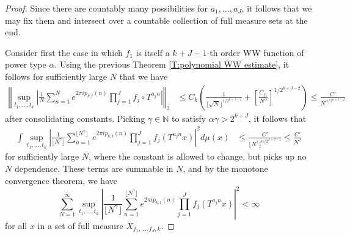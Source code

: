 \documentclass[11pt, oneside]{amsart}   	%
\newcommand{\1}{\mathbbm{1}}
\newcommand{\N}{\mathbb{N}}
\newcommand{\floor}[1]{\lfloor#1\rfloor}
\theoremstyle{definition}
\begin{document}
\begin{proof}
Since there are countably many possibilities for $a_1, \dots, a_J$, it follows that we may fix them and intersect over a countable collection of full measure sets at the end.

Consider first the case in which $f_1$ is itself a $k+J-1$-th order WW function of power type $\alpha$. Using the previous Theorem \ref{T:polynomial WW estimate}, it follows for sufficiently large $N$ that we have
\begin{align*}
\left\Vert \sup_{t_1, \dots, t_k} \left|\frac{1}{N}\sum_{n=1}^N e^{2\pi i p_{k, t}(n)} \prod_{j=1}^J f_j \circ T^{a_j n} \right| \right\Vert_2 &\leq C_k\left(\frac{1}{\floor{\sqrt{N}}^{1/2^{k+J-2}}} + \left[\frac{C_{f_1}}{N^\alpha}\right]^{1/2^{k+J-2}}\right) \leq \frac{C'}{N^{\alpha / 2^{k + J - 2}}}
\end{align*}
after consolidating constants. Picking $\gamma \in \N$ to satisfy $\alpha \gamma > 2^{k + J}$, it follows that 
\begin{align*}
\int \sup_{t_1, \dots, t_k} \left|\frac{1}{\floor{N^\gamma}}\sum_{n=1}^{\floor{N^\gamma}} e^{2\pi i p_{k, t}(n)} \prod_{j=1}^J f_j (T^{a_j n} x) \right|^2 d\mu(x) &\leq \frac{C'}{\floor{N^\gamma}^{\alpha/2^{k+J-1}}} \leq \frac{C'}{N^2}
\end{align*}
for sufficiently large $N$, where the constant is allowed to change, but picks up no $N$ dependence. These terms are summable in $N$, and by the monotone convergence theorem, we have
$$\sum_{N=1}^\infty \sup_{t_1, \dots, t_k} \left|\frac{1}{\floor{N^\gamma}}\sum_{n=1}^{\floor{N^\gamma}} e^{2\pi i p_{k, t}(n)} \prod_{j=1}^J f_j (T^{a_j n} x) \right|^2 < \infty $$
for all $x$ in a set of full measure $X_{f_1, \dots, f_{J}, k}$.


\end{proof}
\end{document}
